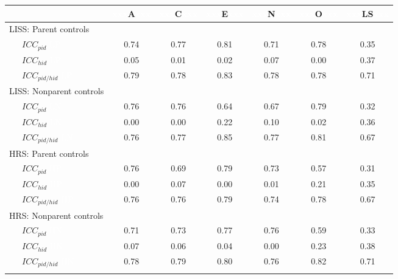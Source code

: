\documentclass[
  english,
  man, noextraspace]{apa7}
\begin{document}
\begin{appendix}
\begin{table}[h]
\begin{center}
\begin{threeparttable}
\begin{tabular}{lcccccc}
\toprule
& \multicolumn{1}{c}{\textcolor{white}{xxx}A\textcolor{white}{xxx}} & \multicolumn{1}{c}{\textcolor{white}{xxx}C\textcolor{white}{xxx}} & \multicolumn{1}{c}{\textcolor{white}{xxx}E\textcolor{white}{xxx}} & \multicolumn{1}{c}{\textcolor{white}{xxx}N\textcolor{white}{xxx}} & \multicolumn{1}{c}{\textcolor{white}{xxx}O\textcolor{white}{xxx}} & \multicolumn{1}{c}{\textcolor{white}{xxx}LS\textcolor{white}{xxx}}\\
\midrule
LISS: Parent controls &  &  &  &  &  & \\
\ \ \ $ICC_{pid}$ \textcolor{white}{LP} & 0.74 & 0.77 & 0.81 & 0.71 & 0.78 & 0.35\\
\ \ \ $ICC_{hid}$ \textcolor{white}{LP} & 0.05 & 0.01 & 0.02 & 0.07 & 0.00 & 0.37\\
\ \ \ $ICC_{pid/hid}$ \textcolor{white}{LP} & 0.79 & 0.78 & 0.83 & 0.78 & 0.78 & 0.71\\
LISS: Nonparent controls &  &  &  &  &  & \\
\ \ \ $ICC_{pid}$ \textcolor{white}{LN} & 0.76 & 0.76 & 0.64 & 0.67 & 0.79 & 0.32\\
\ \ \ $ICC_{hid}$ \textcolor{white}{LN} & 0.00 & 0.00 & 0.22 & 0.10 & 0.02 & 0.36\\
\ \ \ $ICC_{pid/hid}$ \textcolor{white}{LN} & 0.76 & 0.77 & 0.85 & 0.77 & 0.81 & 0.67\\
HRS: Parent controls &  &  &  &  &  & \\
\ \ \ $ICC_{pid}$ \textcolor{white}{HP} & 0.76 & 0.69 & 0.79 & 0.73 & 0.57 & 0.31\\
\ \ \ $ICC_{hid}$ \textcolor{white}{HP} & 0.00 & 0.07 & 0.00 & 0.01 & 0.21 & 0.35\\
\ \ \ $ICC_{pid/hid}$ \textcolor{white}{HP} & 0.76 & 0.76 & 0.79 & 0.74 & 0.78 & 0.67\\
HRS: Nonparent controls &  &  &  &  &  & \\
\ \ \ $ICC_{pid}$ \textcolor{white}{HN} & 0.71 & 0.73 & 0.77 & 0.76 & 0.59 & 0.33\\
\ \ \ $ICC_{hid}$ \textcolor{white}{HN} & 0.07 & 0.06 & 0.04 & 0.00 & 0.23 & 0.38\\
\ \ \ $ICC_{pid/hid}$ \textcolor{white}{HN} & 0.78 & 0.79 & 0.80 & 0.76 & 0.82 & 0.71\\
\bottomrule
\addlinespace
\end{tabular}


\end{threeparttable}
\end{center}
\end{table}
\end{appendix}
\end{document}
